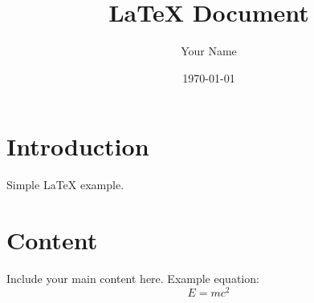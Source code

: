 \documentclass[a4paper,12pt]{article}
\begin{document}
\title{LaTeX Document}
\author{Your Name}
\date{\today}
\maketitle

\section{Introduction}
Simple LaTeX example.

\section{Content}
Include your main content here. Example equation:
\begin{equation}
    E = mc^2
\end{equation}
\end{document}
